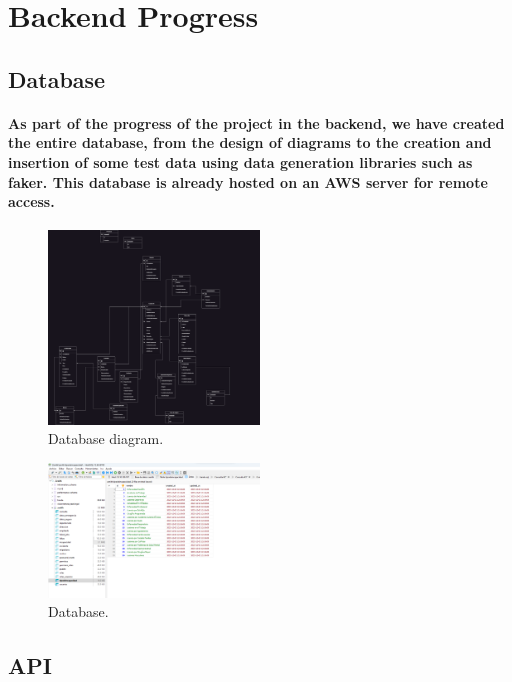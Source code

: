 \documentclass[12pt,a4paper]{article}
\begin{document}
	\section{Backend Progress}
    
    \subsection{Database}

    \paragraph{As part of the progress of the project in the backend, we have created the entire database, from the design of diagrams to the creation and insertion of some test data using data generation libraries such as faker. This database is already hosted on an AWS server for remote access.}

    \begin{figure}[ht]
      \centering
      \includegraphics[width=0.5\textwidth]{diagram.png}
      \caption{Database diagram.}
    \end{figure}

    \begin{figure}[ht]
      \centering
      \includegraphics[width=0.5\textwidth]{database.png}
      \caption{Database.}
    \end{figure}

    \clearpage

    \subsection{API}
\end{document}
